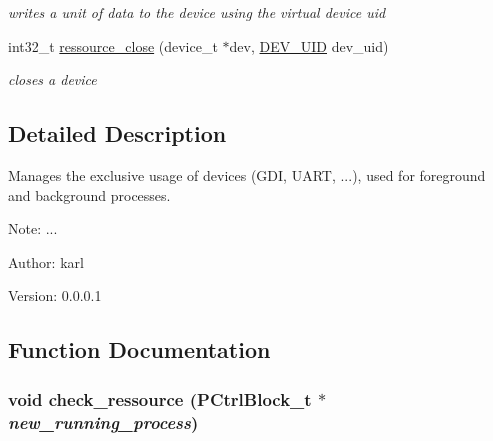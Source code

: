 \begin{CompactItemize}
\begin{CompactList}\small\item\em writes a unit of data to the device using the virtual device uid \item\end{CompactList}\item 
int32\_\-t \hyperlink{group___r_e_s_o_u_r_c_e___m_g271870da508ff83711dac2abc49871c9}{ressource\_\-close} (device\_\-t $\ast$dev, \hyperlink{group___d_e_v_i_c_e___a_p_i_g9f427f7fc1dc07b788af60c2aaa6b8d3}{DEV\_\-UID} dev\_\-uid)
\begin{CompactList}\small\item\em closes a device \item\end{CompactList}\end{CompactItemize}


\subsection{Detailed Description}
Manages the exclusive usage of devices (GDI, UART, ...), used for foreground and background processes. 

\begin{Desc}
\item[Note:]... \end{Desc}
\begin{Desc}
\item[Author:]karl \end{Desc}
\begin{Desc}
\item[Version:]0.0.0.1 \end{Desc}


\subsection{Function Documentation}
\hypertarget{group___r_e_s_o_u_r_c_e___m_g5d470ccb4591d7168916467ba0b93b20}{
\subsubsection[{check\_\-ressource}]{\setlength{\rightskip}{0pt plus 5cm}void check\_\-ressource ({\bf PCtrlBlock\_\-t} $\ast$ {\em new\_\-running\_\-process})}}
\label{group___r_e_s_o_u_r_c_e___m_g5d470ccb4591d7168916467ba0b93b20}



